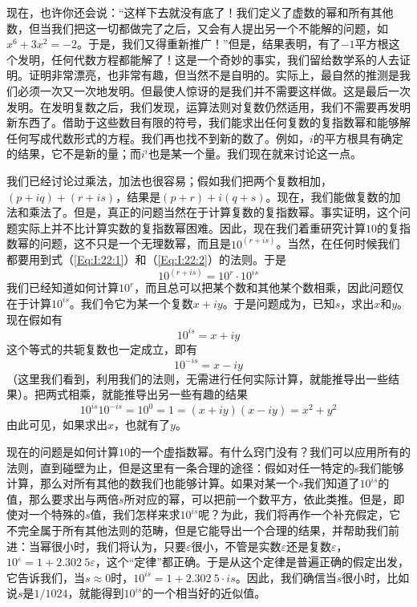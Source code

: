 现在，也许你还会说：“这样下去就没有底了！我们定义了虚数的幂和所有其他数，但当我们把这一切都做完了之后，又会有人提出另一个不能解的问题，如$x^6+3x^2=-2$。于是，我们又得重新推广！”但是，结果表明，有了$-1$平方根这个发明，任何代数方程都能解了！这是一个奇妙的事实，我们留给数学系的人去证明。证明非常漂亮，也非常有趣，但当然不是自明的。实际上，最自然的推测是我们必须一次又一次地发明。但最使人惊讶的是我们并不需要这样做。这是最后一次发明。在发明复数之后，我们发现，运算法则对复数仍然适用，我们不需要再发明新东西了。借助于这些数目有限的符号，我们能求出任何复数的复指数幂和能够解任何写成代数形式的方程。我们再也找不到新的数了。例如，$i$的平方根具有确定的结果，它不是新的量；而$i^{i}$也是某一个量。我们现在就来讨论这一点。

我们已经讨论过乘法，加法也很容易；假如我们把两个复数相加，$(p+iq)+(r+is)$，结果是$(p+r)+i(q+s)$。现在，我们能做复数的加法和乘法了。但是，真正的问题当然在于计算复数的复指数幂。事实证明，这个问题实际上并不比计算实数的复指数幂困难。因此，现在我们着重研究计算$10$的复指数幂的问题，这不只是一个无理数幂，而且是$10^{(r+is)}$。当然，在任何时候我们都要用到式（\ref{Eq:I:22:1}）和（\ref{Eq:I:22:2}）的法则。于是
\begin{equation}
    \label{Eq:I:22:5}
    10^{(r+is)}=10^r\cdot 10^{is}
\end{equation}
我们已经知道如何计算$10^r$，而且总可以把某个数和其他某个数相乘，因此问题仅在于计算$10^{is}$。我们令它为某一个复数$x+iy$。于是问题成为，已知$s$，求出$x$和$y$。现在假如有
\begin{equation*}
    10^{is} = x + iy
\end{equation*}
这个等式的共轭复数也一定成立，即有
\begin{equation*}
    10^{-is} = x - iy
\end{equation*}
（这里我们看到，利用我们的法则，无需进行任何实际计算，就能推导出一些结果）。把两式相乘，就能推导出另一些有趣的结果
\begin{equation}
    \label{Eq:I:22:6}
    10^{is}10^{-is}=10^0=1=(x+iy)(x-iy)=x^2+y^2
\end{equation}
由此可见，如果求出$x$，也就有了$y$。

现在的问题是如何计算$10$的一个虚指数幂。有什么窍门没有？我们可以应用所有的法则，直到碰壁为止，但是这里有一条合理的途径：假如对任一特定的s我们能够计算，那么对所有其他的数我们也能够计算。如果对某一个$s$我们知道了$10^{is}$的值，那么要求出与两倍$s$所对应的幂，可以把前一个数平方，依此类推。但是，即使对一个特殊的$s$值，我们怎样来求$10^{is}$呢？为此，我们将再作一个补充假定，它不完全属于所有其他法则的范畴，但是它能导出一个合理的结果，并帮助我们前进：当幂很小时，我们将认为，只要$\varepsilon$很小，不管是实数$\varepsilon$还是复数$\varepsilon$，$10^{\varepsilon}=1+2.302~5\varepsilon$，这个“定律”都正确。于是从这个定律是普遍正确的假定出发，它告诉我们，当$s\approx 0$时，$10^{is}=1+2.302~5\cdot is$。因此，我们确信当$s$很小时，比如说$s$是$1/1 024$，就能得到$10^{is}$的一个相当好的近似值。

